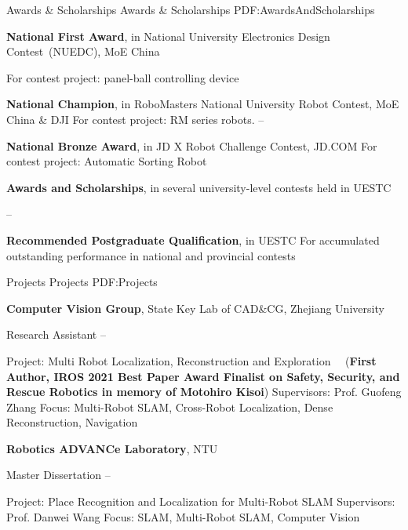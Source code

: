 \documentclass[letterpaper,MMMyyyy,nonstopmode]{simpleresumecv}
\begin{document}
\begin{Body}

\Section
{Awards \&\newline
	Scholarships}
{Awards \& Scholarships}
{PDF:AwardsAndScholarships}

\Entry
\textbf{National First Award},
in National University Electronics Design Contest~(NUEDC), 
MoE China

\BulletItem
For contest project: panel-ball controlling device
\hfill
{}

\Gap
\Entry
\textbf{National Champion},
in RoboMasters National University Robot Contest,
MoE China \& DJI
\BulletItem
For contest project: RM series robots.
\hfill
{} --

\Gap
\Entry
\textbf{National Bronze Award},
in JD X Robot Challenge Contest,
JD.COM
\BulletItem
For contest project: Automatic Sorting Robot
\hfill
{}

\Gap
\Entry
\textbf{Awards and Scholarships}, 
in several university-level contests held in UESTC

\hfill
{} --

\Gap
\Entry
\textbf{Recommended Postgraduate Qualification},
in UESTC
\BulletItem
For accumulated outstanding performance in national and provincial contests
\hfill
{}



\Section
{Projects}
{Projects}
{PDF:Projects}

\Entry
{\textbf{Computer Vision Group}},
State Key Lab of CAD\&CG, Zhejiang University

\BulletItem
Research Assistant
\hfill
{} --
\begin{Detail}
\SubBulletItem
Project:
Multi Robot Localization, Reconstruction and Exploration ~\cite{xiangyu2021coxgraph}~(\textbf{First Author, IROS 2021 Best Paper Award Finalist on Safety, Security, and Rescue Robotics in memory of Motohiro Kisoi})
\SubBulletItem
Supervisors:
Prof. Guofeng Zhang
\SubBulletItem
Focus:
Multi-Robot SLAM, Cross-Robot Localization, Dense Reconstruction, Navigation
\end{Detail}

\Gap
\Entry
{\textbf{Robotics ADVANCe Laboratory}},
NTU

\BulletItem
Master Dissertation
\hfill
{} --
\begin{Detail}
\SubBulletItem
Project:
Place Recognition and Localization for Multi-Robot SLAM \cite{xiangyu2019quantitative}
\SubBulletItem
Supervisors:
Prof. Danwei Wang
\SubBulletItem
Focus:
SLAM, Multi-Robot SLAM, Computer Vision
\end{Detail}


\end{Body}
\end{document}
